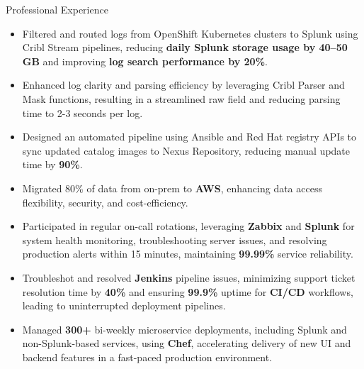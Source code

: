 \documentclass{resume}
\begin{document}
\begin{experienceSection}{Professional Experience}
    \experienceItem[
        company={Arch Mortgage Insurance},
        location={Greensboro, NC},
        position={IT-Infrastructure-Platform/SRE Intern},
        duration={Jun 2024 - Aug 2024}
    ]
    \begin{itemize}
        \itemsep -6pt {}
        \item Filtered and routed logs from OpenShift Kubernetes clusters to Splunk using Cribl Stream pipelines, reducing \textbf{daily Splunk storage usage by 40–50 GB} and improving \textbf{log search performance by 20\%}.
        \item Enhanced log clarity and parsing efficiency by leveraging Cribl Parser and Mask functions, resulting in a streamlined raw field and reducing parsing time to 2-3 seconds per log.
        \item Designed an automated pipeline using Ansible and Red Hat registry APIs to sync updated catalog images to Nexus Repository, reducing manual update time by\textbf{ 90\%}.
        
    \end{itemize}

    \experienceItem[
        company={Cerner Healthcare},
        location={Bangalore, India},
        position={System Engineer - 1},
        duration={May 2021 - Jul 2023}
    ]
    \begin{itemize}
        \itemsep -6pt {}
        \item Migrated 80\% of data from on-prem to \textbf{AWS}, enhancing data access flexibility, security, and cost-efficiency.
        \item Participated in regular on-call rotations, leveraging \textbf{Zabbix} and \textbf{Splunk} for system health monitoring, troubleshooting server issues, and resolving production alerts within 15 minutes, maintaining \textbf{99.99\%} service reliability.
        \item Troubleshot and resolved \textbf{Jenkins} pipeline issues, minimizing support ticket resolution time by \textbf{40\%} and ensuring \textbf{99.9\%} uptime for \textbf{CI/CD} workflows, leading to uninterrupted deployment pipelines.
        \item Managed \textbf{300+} bi-weekly microservice deployments, including Splunk and non-Splunk-based services, using \textbf{Chef}, accelerating delivery of new UI and backend features in a fast-paced production environment.
    \end{itemize}

\end{experienceSection}
\end{document}
